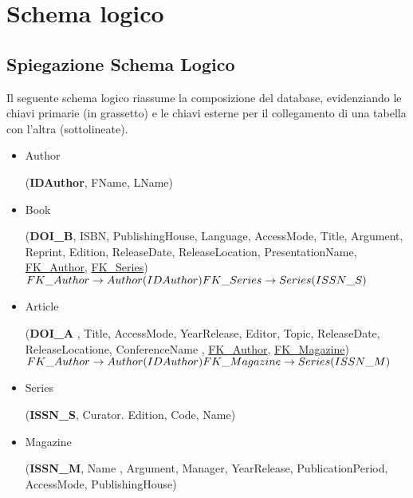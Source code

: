 \chapter{Schema logico}
	\section{Spiegazione Schema Logico}
	Il seguente schema logico riassume la composizione del database, evidenziando le chiavi primarie (in grassetto) e le chiavi esterne per il collegamento di una tabella con l'altra (sottolineate).
																			
\begin{itemize}
\subsection{Schema Logico}

\item Author


(\textbf{IDAuthor}, FName, LName)




\item Book


(\textbf{DOI\_B}, ISBN, PublishingHouse, Language, AccessMode, Title, Argument, Reprint, Edition, ReleaseDate, ReleaseLocation, PresentationName, \underline{FK\_Author}, \underline{FK\_Series})\\

	$FK\_Author \rightarrow Author(IDAuthor)\\
	 FK\_Series \rightarrow Series(ISSN\_S)$


\item Article

(\textbf{DOI\_A} , Title, AccessMode, YearRelease, Editor, Topic, ReleaseDate, ReleaseLocatione, ConferenceName , \underline{FK\_Author}, \underline{FK\_Magazine})\\

$FK\_Author \rightarrow Author(IDAuthor) \\
	 FK\_Magazine \rightarrow Series(ISSN\_M)$

\item Series


(\textbf{ISSN\_S}, Curator. Edition, Code, Name)\\



\item Magazine


(\textbf{ISSN\_M}, Name , Argument, Manager, YearRelease, PublicationPeriod, AccessMode,
PublishingHouse)



\end{itemize}
